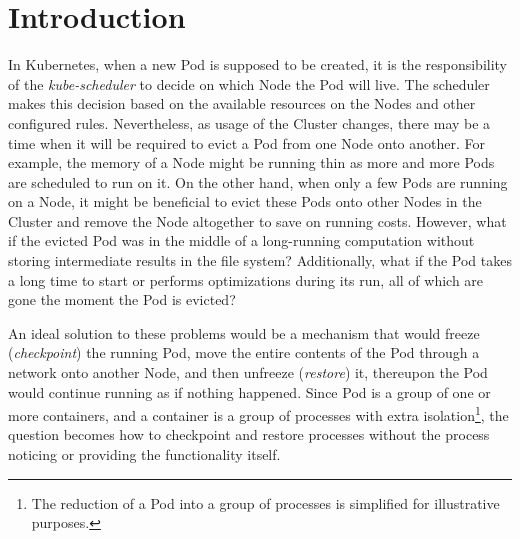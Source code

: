 \documentclass[
  digital,     %
  oneside,     %
  nosansbold,  %
  nocolorbold, %
  lof,         %
  nolot,         %
]{fithesis4}
\begin{document}
\chapter*{Introduction}

In Kubernetes, when a new Pod is supposed to be created, it is the responsibility of the \emph{kube-scheduler} to decide on which Node the Pod will live. The scheduler makes this decision based on the available resources on the Nodes and other configured rules. Nevertheless, as usage of the Cluster changes, there may be a time when it will be required to evict a Pod from one Node onto another. For example, the memory of a Node might be running thin as more and more Pods are scheduled to run on it. On the other hand, when only a few Pods are running on a Node, it might be beneficial to evict these Pods onto other Nodes in the Cluster and remove the Node altogether to save on running costs. However, what if the evicted Pod was in the middle of a long-running computation without storing intermediate results in the file system? Additionally, what if the Pod takes a long time to start or performs optimizations during its run, all of which are gone the moment the Pod is evicted?

An ideal solution to these problems would be a mechanism that would freeze (\emph{checkpoint}) the running Pod, move the entire contents of the Pod through a network onto another Node, and then unfreeze (\emph{restore}) it, thereupon the Pod would continue running as if nothing happened. Since Pod is a group of one or more containers, and a container is a group of processes with extra isolation\footnote{The reduction of a Pod into a group of processes is simplified for illustrative purposes.}, the question becomes how to checkpoint and restore processes without the process noticing or providing the functionality itself.
\end{document}
